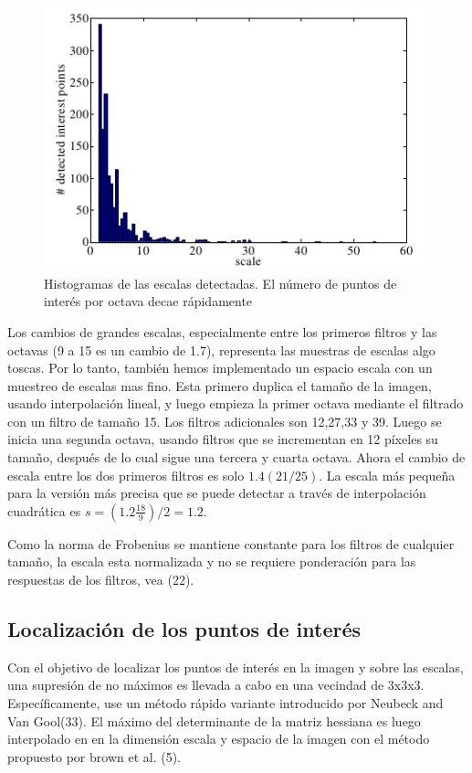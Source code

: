 \begin{figure}[tbhp]
   \centering
        \includegraphics[scale=0.4]{./figs/histogramoctaves}
    \caption[Histogramas de las escalas detectadas]{Histogramas de las escalas detectadas. El número de puntos de interés por octava decae rápidamente}
   \label{fig:histogramoctaves}                %
\end{figure}

Los cambios de grandes escalas, especialmente entre los primeros filtros y las octavas (9 a 15 es un cambio de 1.7), representa las muestras de escalas algo toscas. Por lo tanto, también hemos implementado un espacio escala con un muestreo de escalas mas fino. Esta primero duplica el tamaño de la imagen, usando interpolación lineal, y luego empieza la primer octava mediante el filtrado con un filtro de tamaño 15. Los filtros adicionales son 12,27,33 y 39. Luego se inicia una segunda octava, usando filtros que se incrementan en 12 píxeles su tamaño, después de lo cual sigue una tercera y cuarta octava. Ahora el cambio de escala entre los dos primeros filtros es solo $1.4 (21/25)$. La escala más pequeña para la versión más precisa que se puede detectar a través de interpolación cuadrática es $s=(1.2\frac{18}{9})/2=1.2$.

Como la norma de Frobenius se mantiene constante para los filtros de cualquier tamaño, la escala esta normalizada y no se requiere ponderación para las respuestas de los filtros, vea (22).

\subsection{Localización de los puntos de interés}
\label{sec34}
Con el objetivo de localizar los puntos de interés en la imagen y sobre las escalas, una supresión de no máximos es llevada a cabo en una vecindad de 3x3x3. Específicamente, use un método rápido variante introducido por Neubeck and Van Gool(33). El máximo del determinante de la matriz hessiana es luego interpolado en en la dimensión escala y espacio de la imagen con el método propuesto por brown et al. (5).

